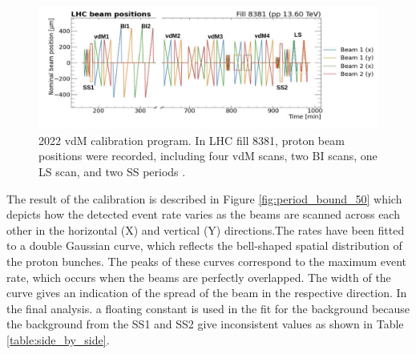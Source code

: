 \begin{figure}[!htp]
\centering
\includegraphics[width=1\textwidth]{ashish_thesis/2022_vdM.png}
\caption[2022 vdM program]{%
  2022 vdM calibration program. In LHC fill 8381, proton beam positions were recorded, including four vdM scans, two BI scans, one LS scan, and two SS periods \cite{pas_22}.
}
\label{fig:2022_vdM_program}
\end{figure}


The result of the calibration is described in
Figure \ref{fig:period_bound_50} which depicts how the detected event rate varies as the beams are scanned across each other in the horizontal (X) and vertical (Y) directions.The rates have been fitted to a double Gaussian curve, which reflects the bell-shaped spatial distribution of the proton bunches. The peaks of these curves correspond to the maximum event rate, which occurs when the beams are perfectly overlapped. The width of the curve gives an indication of the spread of the beam in the respective direction. In the final analysis. a floating constant is used in the fit for the background because the background from the SS1 and SS2 give inconsistent values as shown in Table \ref{table:side_by_side}.

